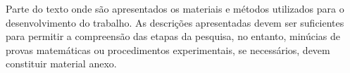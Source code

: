 Parte do texto onde são apresentados os materiais e métodos utilizados para o desenvolvimento do trabalho. As descrições apresentadas devem ser suficientes para permitir a compreensão das etapas da pesquisa, no entanto, minúcias de provas matemáticas ou procedimentos experimentais, se necessários, devem constituir material anexo.